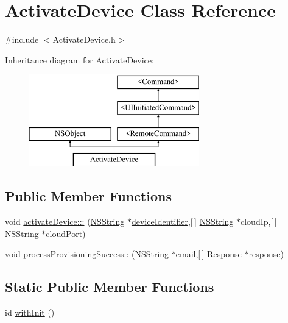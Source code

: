 \hypertarget{interface_activate_device}{
\section{\-Activate\-Device \-Class \-Reference}
\label{interface_activate_device}
}


{\ttfamily \#include $<$\-Activate\-Device.\-h$>$}

\-Inheritance diagram for \-Activate\-Device\-:\begin{figure}[H]
\begin{center}
\leavevmode
\includegraphics[height=4.000000cm]{interface_activate_device}
\end{center}
\end{figure}
\subsection*{\-Public \-Member \-Functions}
\begin{DoxyCompactItemize}
\item 
void \hyperlink{interface_activate_device_a259ebc23ef852a20e3d1b38fd3d4bbe4}{activate\-Device\-:::} (\hyperlink{class_n_s_string}{\-N\-S\-String} $\ast$\hyperlink{_activation_util_8m_a3a7765336d2edc6b3dce304e4f59c2ce}{device\-Identifier},\mbox{[}$\,$\mbox{]} \hyperlink{class_n_s_string}{\-N\-S\-String} $\ast$cloud\-Ip,\mbox{[}$\,$\mbox{]} \hyperlink{class_n_s_string}{\-N\-S\-String} $\ast$cloud\-Port)
\item 
void \hyperlink{interface_activate_device_aaf23b31fb95cf505526a372929ab1215}{process\-Provisioning\-Success\-::} (\hyperlink{class_n_s_string}{\-N\-S\-String} $\ast$email,\mbox{[}$\,$\mbox{]} \hyperlink{interface_response}{\-Response} $\ast$response)
\end{DoxyCompactItemize}
\subsection*{\-Static \-Public \-Member \-Functions}
\begin{DoxyCompactItemize}
\item 
id \hyperlink{interface_activate_device_aab35a3c7b82f050aa5a51a205ae6afbc}{with\-Init} ()
\end{DoxyCompactItemize}


